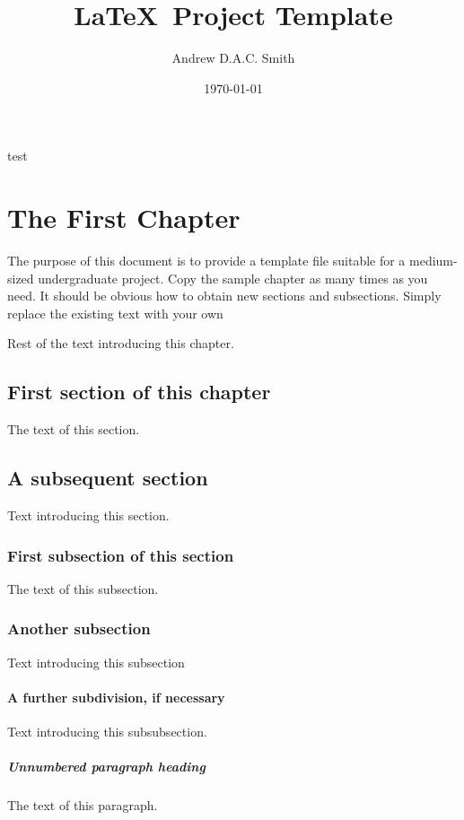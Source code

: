 \documentclass[a4paper, 12pt, notitlepage]{report}
\title{\LaTeX\ Project Template} %
\author{Andrew D.A.C. Smith} %
\date{\today} %
\begin{document}
\begin{titlepage} %
	test
\end{titlepage}



\chapter*{The First Chapter}
%
The purpose of this document is to provide a template file suitable for a medium-sized undergraduate project.
Copy the sample chapter as many times as you need.
It should be obvious how to obtain new sections and subsections.
Simply replace the existing text with your own 

Rest of the text introducing this chapter.

\section*{First section of this chapter}
%
The text of this section.

\section*{A subsequent section}
%
Text introducing this section.

\subsection*{First subsection of this section}
%
The text of this subsection.

\subsection{Another subsection}
%
Text introducing this subsection

\subsubsection{A further subdivision, if necessary}
%
Text introducing this subsubsection.

\paragraph{Unnumbered paragraph heading}
The text of this paragraph.
\end{document}
